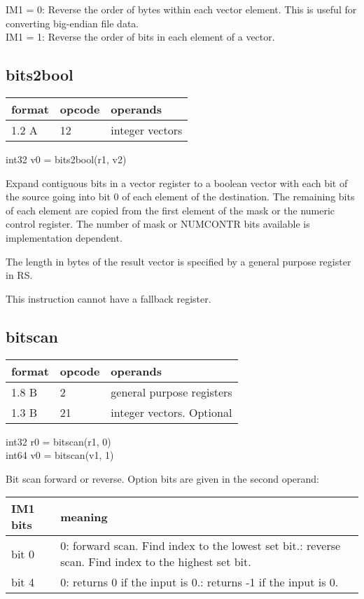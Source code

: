 \documentclass[forwardcom.tex]{subfiles}
\begin{document}
IM1 = 0: Reverse the order of bytes within each vector element. This is useful for converting big-endian file data.\\
IM1 = 1: Reverse the order of bits in each element of a vector.
\vv


\subsection{bits2bool}
\label{table:bits2boolInstruction}
\begin{tabular}{|p{12mm}|p{15mm}|p{100mm}|}
\hline
\bfseries format & \bfseries opcode & \bfseries operands \\ \hline
1.2 A & 12 & integer vectors \\ \hline
\end{tabular}
\vv

int32 v0 = bits2bool(r1, v2)
\vv

Expand contiguous bits in a vector register to a boolean vector with each bit of the source going into bit 0 of each element of the destination. 
The remaining bits of each element are copied from the first element of the mask or the numeric control register. The number of mask or NUMCONTR bits available is implementation dependent.
\vv

The length in bytes of the result vector is specified by a general purpose register in RS.
\vv

This instruction cannot have a fallback register.
\vv

\subsection{bitscan}
\label{table:bitscanInstruction}
\begin{tabular}{|p{12mm}|p{15mm}|p{100mm}|}
\hline
\bfseries format & \bfseries opcode & \bfseries operands \\ \hline
1.8 B &  2 & general purpose registers \\ \hline
1.3 B & 21 & integer vectors. Optional \\ \hline
\end{tabular}
\vv

int32 r0 = bitscan(r1, 0)\\
int64 v0 = bitscan(v1, 1)
\vv

Bit scan forward or reverse. Option bits are given in the second operand:
\vv

\label{table:bitscanOptions}
\begin{tabular}{|p{16mm}|p{122mm}|}
\hline
\bfseries IM1 bits & \bfseries meaning \\ \hline
bit 0 & 0: forward scan. Find index to the lowest set bit.\newline
        1: reverse scan. Find index to the highest set bit.\\
\hline
bit 4 & 0: returns  0 if the input is 0.\newline
        1: returns -1 if the input is 0.\\ \hline
\end{tabular}
\vv
\end{document}
